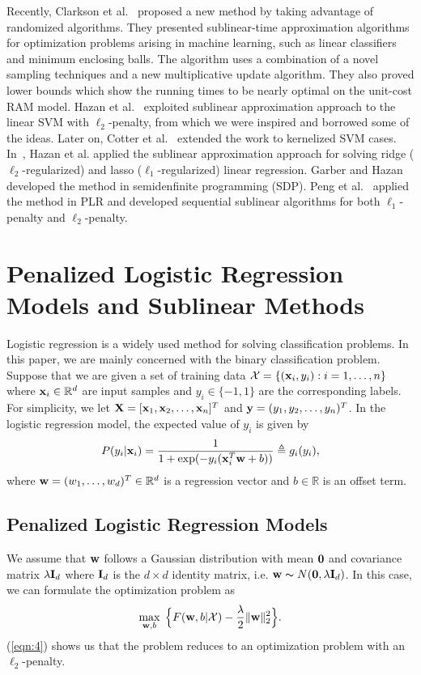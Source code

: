 \documentclass{llncs}
\newcommand{\bw}{\mathbf{w}}
\def\I{{\bf I}}
\def\X{{\bf X}}
\def\x{{\bf x}}
\def\y{{\bf y}}
\def\w{{\bf w}}
\def\0{{\bf 0}}
\def\XM{{\mathcal X}}
\def\RB{{\mathbb R}}
\begin{document}
Recently, Clarkson et al.~\cite{clarkson2010sublinear} proposed a new method by taking advantage of randomized algorithms.
They presented sublinear-time approximation algorithms for optimization problems arising in machine learning, such as linear classifiers and minimum enclosing balls.
The algorithm uses a combination of a novel sampling techniques and a new multiplicative update algorithm. They also proved lower bounds which show the running times to be nearly optimal on the unit-cost RAM model.
Hazan et al.~\cite{hazanbeating} exploited sublinear approximation approach to the linear SVM with $\ell_2$-penalty, from which we were inspired and borrowed some of the ideas. Later on, Cotter et al.~\cite{cotter2012kernelized} extended the work to kernelized SVM cases. In~\cite{hazan2011optimal}, Hazan et al. applied the sublinear approximation approach for solving ridge ($\ell_2$-regularized) and lasso ($\ell_1$-regularized) linear regression. Garber and Hazan~\cite{garberapproximating} developed the method in semidenfinite programming (SDP). Peng et al.~\cite{peng2012sublinear} applied the method in PLR and developed sequential sublinear algorithms for both $\ell_1$-penalty and $\ell_2$-penalty.

\section{Penalized Logistic Regression Models and Sublinear Methods} \label{sec:plr}
Logistic regression is a widely used method for solving classification problems.
In this paper, we are mainly concerned with the binary classification problem.  	
Suppose that we are given a set of training data $\XM=\{(\x_i, y_i): i=1, \ldots, n\}$ where $\x_i \in \RB^d$ are input samples and $y_i \in \{-1, 1\}$ are the corresponding labels.
For simplicity, we let $\X=[{\x}_{1}, {\x}_{2}, \ldots, {\x}_n]^{T}$ and $\y=(y_1, y_2, \ldots, y_n)^T$.
In the logistic regression model, the expected value of $y_i$ is given by
\[
P(y_i|\x_i)= \frac{1}{1+ \exp(- y_i(\x_i^T \w + b))} \triangleq g_i(y_i),
\]
where $\w=(w_1, \ldots, w_d)^T \in \RB^d$ is a regression vector and $b\in \RB$ is an offset term.

\subsection{Penalized Logistic Regression Models}
We assume that $\w$ follows a Gaussian distribution with mean $\0$ and covariance matrix $\lambda \I_d$ where $\I_d$ is the $d{\times}d$ identity matrix, i.e. $\w \thicksim N(\0, \lambda \I_d)$.
In this case, we can formulate the optimization problem as
\begin{equation} \label{eqn:4}
	\max_{\bw ,b} \; \Big\{F(\w, b| \XM) - \frac{\lambda}{2}  \|\bw\|_2^{2} \Big\}.
\end{equation}
(\ref{eqn:4}) shows us that the problem reduces to an optimization problem with an $\ell_2$-penalty.
	
\end{document}
